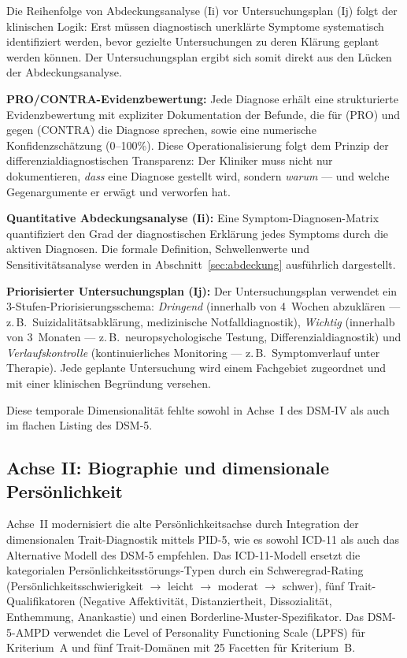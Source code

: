 \documentclass[11pt,a4paper]{article}
\begin{document}
Die Reihenfolge von Abdeckungsanalyse (Ii) vor Untersuchungsplan (Ij) folgt der klinischen Logik: Erst m\"ussen diagnostisch unerkl\"arte Symptome systematisch identifiziert werden, bevor gezielte Untersuchungen zu deren Kl\"arung geplant werden k\"onnen. Der Untersuchungsplan ergibt sich somit direkt aus den L\"ucken der Abdeckungsanalyse.

\textbf{PRO/CONTRA-Evidenzbewertung:} Jede Diagnose erh\"alt eine strukturierte Evidenzbewertung mit expliziter Dokumentation der Befunde, die f\"ur (PRO) und gegen (CONTRA) die Diagnose sprechen, sowie eine numerische Konfidenzsch\"atzung (0--100\%). Diese Operationalisierung folgt dem Prinzip der differenzialdiagnostischen Transparenz: Der Kliniker muss nicht nur dokumentieren, \textit{dass} eine Diagnose gestellt wird, sondern \textit{warum} --- und welche Gegenargumente er erw\"agt und verworfen hat.

\textbf{Quantitative Abdeckungsanalyse (Ii):} Eine Symptom-Diagnosen-Matrix quantifiziert den Grad der diagnostischen Erkl\"arung jedes Symptoms durch die aktiven Diagnosen. Die formale Definition, Schwellenwerte und Sensitivit\"atsanalyse werden in Abschnitt~\ref{sec:abdeckung} ausf\"uhrlich dargestellt.

\textbf{Priorisierter Untersuchungsplan (Ij):} Der Untersuchungsplan verwendet ein 3-Stufen-Priorisierungsschema: \textit{Dringend} (innerhalb von 4~Wochen abzukl\"aren --- z.\,B.\ Suizidalit\"atsabkl\"arung, medizinische Notfalldiagnostik), \textit{Wichtig} (innerhalb von 3~Monaten --- z.\,B.\ neuropsychologische Testung, Differenzialdiagnostik) und \textit{Verlaufskontrolle} (kontinuierliches Monitoring --- z.\,B.\ Symptomverlauf unter Therapie). Jede geplante Untersuchung wird einem Fachgebiet zugeordnet und mit einer klinischen Begr\"undung versehen.

Diese temporale Dimensionalit\"at fehlte sowohl in Achse~I des DSM-IV als auch im flachen Listing des DSM-5.

\subsection{Achse II: Biographie und dimensionale Pers\"onlichkeit}

Achse~II modernisiert die alte Pers\"onlichkeitsachse durch Integration der dimensionalen Trait-Diagnostik mittels PID-5, wie es sowohl ICD-11 als auch das Alternative Modell des DSM-5 empfehlen. Das ICD-11-Modell ersetzt die kategorialen Pers\"onlichkeitsst\"orungs-Typen durch ein Schweregrad-Rating (Pers\"onlichkeitsschwierigkeit $\to$ leicht $\to$ moderat $\to$ schwer), f\"unf Trait-Qualifikatoren (Negative Affektivit\"at, Distanziertheit, Dissozialit\"at, Enthemmung, Anankastie) und einen Borderline-Muster-Spezifikator. Das DSM-5-AMPD verwendet die Level of Personality Functioning Scale (LPFS) f\"ur Kriterium~A und f\"unf Trait-Dom\"anen mit 25 Facetten f\"ur Kriterium~B.
\end{document}
